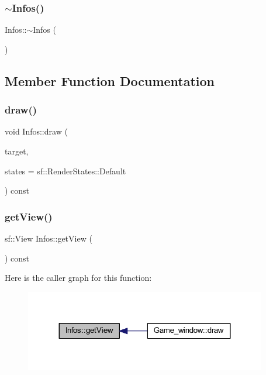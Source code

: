 \subsubsection{\texorpdfstring{$\sim$\+Infos()}{~Infos()}}
{\footnotesize\ttfamily Infos\+::$\sim$\+Infos (\begin{DoxyParamCaption}{ }\end{DoxyParamCaption})}



\subsection{Member Function Documentation}
\mbox{\label{class_infos_af7a440e4bc838e7b3251cbd20c7ad0ae}} 
\subsubsection{\texorpdfstring{draw()}{draw()}}
{\footnotesize\ttfamily void Infos\+::draw (\begin{DoxyParamCaption}\item[{sf\+::\+Render\+Target \&}]{target,  }\item[{sf\+::\+Render\+States}]{states = {\ttfamily sf\+:\+:RenderStates\+:\+:Default} }\end{DoxyParamCaption}) const\hspace{0.3cm}{\ttfamily [virtual]}}

\mbox{\label{class_infos_af68a0d5dafcc767ae4b2b46ac8d7fbe2}} 
\subsubsection{\texorpdfstring{get\+View()}{getView()}}
{\footnotesize\ttfamily sf\+::\+View Infos\+::get\+View (\begin{DoxyParamCaption}{ }\end{DoxyParamCaption}) const}

Here is the caller graph for this function\+:
\nopagebreak
\begin{figure}[H]
\begin{center}
\leavevmode
\includegraphics[width=299pt]{class_infos_af68a0d5dafcc767ae4b2b46ac8d7fbe2_icgraph}
\end{center}
\end{figure}
\mbox{\label{class_infos_a5dee8a8817c307c570db905429480d79}} 
